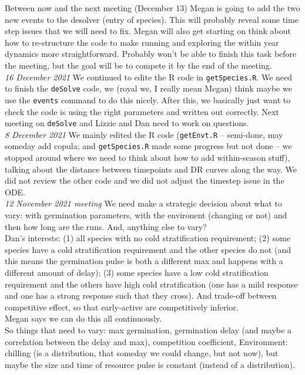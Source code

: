 \documentclass[11pt,letter]{article}
\begin{document}
Between now and the next meeting (December 13) Megan is going to add the two new events to the desolver (entry of species). This will probably reveal some time step issues that we will need to fix. Megan will also get starting on think about how to re-structure the code to make running and exploring the within year dynamics more straightforward. Probably won't be able to finish this task before the meeting, but the goal will be to compete it by the end of the meeting.\\

\emph{16 December 2021} We continued to edite the R code in \verb|getSpecies.R|. We need to finish the \verb|deSolve| code, we (royal we, I really mean Megan) think maybe we use the \verb|events| command to do this nicely. After this, we basically just want to check the code is using the right parameters and written out correctly. Next meeting on \verb|deSolve| and Lizzie and Dan need to work on questions.\\

\emph{8 December 2021} We mainly edited the R code (\verb|getEnvt.R| -- semi-done, may someday add copula; and \verb|getSpecies.R| made some progress but not done -- we stopped around where we need to think about how to add within-season stuff), talking about the distance between timepoints and DR curves along the way. We did not review the other code and we did not adjust the timestep issue in the ODE. \\

\emph{12 November 2021 meeting} We need make a strategic decision about what to vary: with germination parameters, with the environent (changing or not) and then how long are the runs. And, anything else to vary?\\

Dan's interests: (1) all species with no cold stratification requirement; (2) some species have a cold stratification requirement and the other species do not (and this means the germination pulse is both a different max and happens with a different amount of delay); (3) some species have a low cold stratification requirement and the others have high cold stratification (one has a mild response and one has a strong response such that they cross).  And trade-off between competitive effect, so that early-active are competitively inferior. \\ 

Megan says we can do this all continuously.\\

So things that need to vary: max germination, germination delay (and maybe a correlation between the delay and max), competition coefficient, Environment: chilling (is a distribution, that someday we could change, but not now), but maybe the size and time of resource pulse is constant (instead of a distribution).\\
\end{document}
